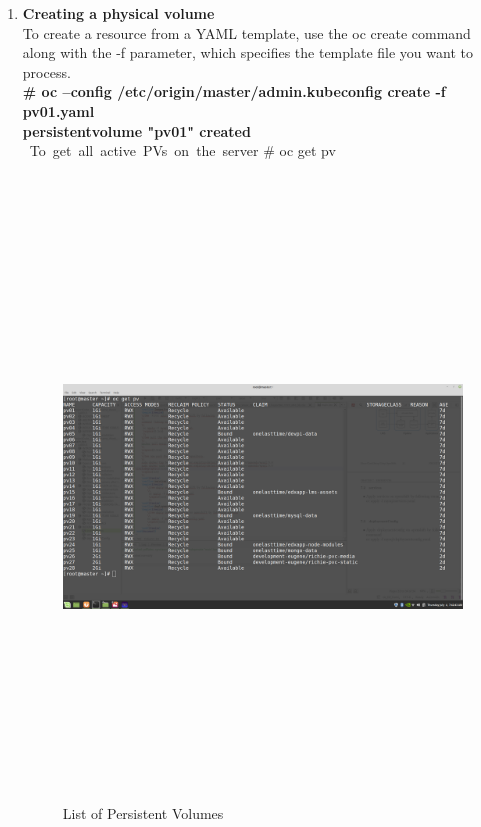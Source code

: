 \documentclass[11pt]{report}
\begin{document}
\begin{enumerate}
\begin{itemize}
		\end{itemize} 
		
		
		\item \textbf{Creating a physical volume}
		\ \\
		To create a resource from a YAML template, use the oc create command along with
		the -f parameter, which specifies the template file you want to process.
		\ \\
		\textbf{
			\# oc --config /etc/origin/master/admin.kubeconfig create -f pv01.yaml
			\ \\
			persistentvolume "pv01" created}
		\ \\
		\ To\ get\ all\ active\ PVs\ on\ the\ server
		\# oc get pv
		\ \\
		\ \\
		\begin{figure}[h!]
    	\begin{center}
    	   			\includegraphics[width=16cm,height=16cm]{pv_image.png}
    		\caption{List of Persistent Volumes}
    	  \end{center}
	  
	\end{figure}
		
		
		
	\end{enumerate}
	
\end{document}
